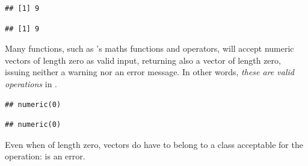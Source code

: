 \documentclass[krantz2]{krantz}\usepackage{knitr}
\begin{document}
\begin{explainbox}
\begin{knitrout}\footnotesize
{}\color{fgcolor}\begin{kframe}
\begin{alltt}
\hlstd{(} \hlstd{(}
\end{alltt}
\begin{verbatim}
## [1] 9
\end{verbatim}
\begin{alltt}
\hlstd{(}
\end{alltt}
\begin{verbatim}
## [1] 9
\end{verbatim}
\end{kframe}
\end{knitrout}

Many functions, such as \Rlang's maths functions and operators, will accept numeric vectors of length zero as valid input, returning also a vector of length zero, issuing neither a warning nor an error message. In other words, \emph{these are valid operations} in \Rlang.

\begin{knitrout}\footnotesize
{}\color{fgcolor}\begin{kframe}
\begin{alltt}
\hlstd{(}\hlstd{(}\hlstd{))}
\end{alltt}
\begin{verbatim}
## numeric(0)
\end{verbatim}
\begin{alltt}
 \hlopt{+} \hlstd{(}\hlstd{)}
\end{alltt}
\begin{verbatim}
## numeric(0)
\end{verbatim}
\end{kframe}
\end{knitrout}

Even when of length zero, vectors do have to belong to a class acceptable for the operation:  is an error.

\end{explainbox}
\label{par:numeric:vectors:end}
\end{document}
